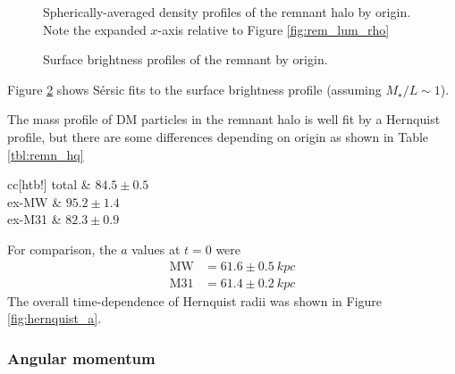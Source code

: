 \documentclass[twocolumn]{aastex63}
\begin{document}
\begin{figure}[htb!]
	\caption{Spherically-averaged density profiles of the remnant halo by origin. Note the expanded $x$-axis relative to Figure \ref{fig:rem_lum_rho}
		\label{fig:rem_DM_rho}}
\end{figure}

\begin{figure}[htb!]
	\caption{Surface brightness profiles of the remnant by origin.
		\label{fig:rem_sersic_origin}}
\end{figure}

Figure \ref{fig:rem_sersic_origin} shows Sérsic fits to the surface brightness profile (assuming $M_\star/L \sim 1$).

The mass profile of DM particles in the remnant halo is well fit by a Hernquist profile, but there are some differences depending on origin as shown in Table \ref{tbl:remn_hq}

\begin{deluxetable}{cc}[htb!]
	\tablewidth{0pt}
	\startdata
	total &  $84.5 \pm 0.5$  \\
	ex-MW &   $95.2 \pm 1.4$  \\
	ex-M31 &   $82.3 \pm 0.9$
	\enddata
\end{deluxetable}

For comparison, the $a$ values at $t=0$ were 
\begin{align*}
	\text{MW} &= 61.6 \pm 0.5\ kpc\\
	\text{M31} &= 61.4 \pm 0.2\ kpc
\end{align*}
The overall time-dependence of Hernquist radii was shown in Figure \ref{fig:hernquist_a}.


\subsubsection{Angular momentum}
\end{document}
